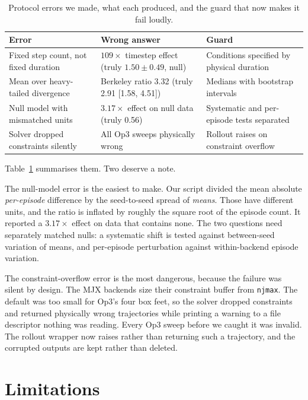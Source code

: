 \documentclass[conference]{IEEEtran}
\newcommand{\tabfont}{\footnotesize}
\begin{document}
\begin{table}[t]
\caption{Protocol errors we made, what each produced, and the guard that
now makes it fail loudly.}
\label{tab:pitfalls}
\centering
\tabfont
\begin{tabular}{@{}p{}p{}p{}@{}}
\toprule
\textbf{Error} & \textbf{Wrong answer} & \textbf{Guard} \\
\midrule
Fixed step count, not fixed duration &
$109\times$ timestep effect (truly $1.50\pm0.49$, null) &
Conditions specified by physical duration \\[3pt]
Mean over heavy-tailed divergence &
Berkeley ratio 3.32 (truly 2.91 [1.58, 4.51]) &
Medians with bootstrap intervals \\[3pt]
Null model with mismatched units &
$3.17\times$ effect on null data (truly 0.56) &
Systematic and per-episode tests separated \\[3pt]
Solver dropped constraints silently &
All Op3 sweeps physically wrong &
Rollout raises on constraint overflow \\
\bottomrule
\end{tabular}
\end{table}

Table~\ref{tab:pitfalls} summarises them. Two deserve a note.

The null-model error is the easiest to make. Our script divided the mean
absolute \emph{per-episode} difference by the seed-to-seed spread of
\emph{means}. Those have different units, and the ratio is inflated by
roughly the square root of the episode count. It reported a $3.17\times$
effect on data that contains none. The two questions need separately
matched nulls: a systematic shift is tested against between-seed variation
of means, and per-episode perturbation against within-backend episode
variation.

The constraint-overflow error is the most dangerous, because the failure
was silent by design. The MJX backends size their constraint buffer from
\texttt{njmax}. The default was too small for Op3's four box feet, so the
solver dropped constraints and returned physically wrong trajectories
while printing a warning to a file descriptor nothing was reading. Every
Op3 sweep before we caught it was invalid. The rollout wrapper now raises
rather than returning such a trajectory, and the corrupted outputs are
kept rather than deleted.

\section{Limitations}
\end{document}
